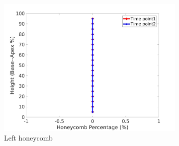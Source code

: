 \begin{figure}[H]
\begin{subfigure}{.42\linewidth}
  \includegraphics[width=\linewidth,trim={{.0\wd0} {.0\wd0} {.0\wd0} {.0\wd0}},clip]{Appendix/Image_AppexA/BaseToApex/IPF10LeftLungHoneycombDiseaseAgainstHeight.jpg} %
  \caption{Left honeycomb}
  \label{fig:IPF10DiseaseAgainstHeight-e} 
\end{subfigure} 
\begin{subfigure}{.42\linewidth}%

\end{subfigure}
\end{figure}
